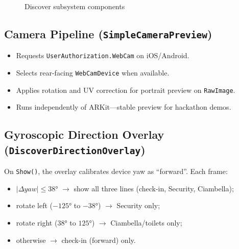\documentclass[11pt,a4paper]{article}
\begin{document}
\begin{figure}[H]
\centering
{}
\caption{Discover subsystem components}
\label{fig:discover}
\end{figure}

\subsection{Camera Pipeline (\texttt{SimpleCameraPreview})}

\begin{itemize}
    \item Requests \texttt{UserAuthorization.WebCam} on iOS/Android.
    \item Selects rear-facing \texttt{WebCamDevice} when available.
    \item Applies rotation and UV correction for portrait preview on \texttt{RawImage}.
    \item Runs independently of ARKit---stable preview for hackathon demos.
\end{itemize}

\subsection{Gyroscopic Direction Overlay (\texttt{DiscoverDirectionOverlay})}

On \texttt{Show()}, the overlay calibrates device yaw as ``forward''. Each frame:

\begin{itemize}
    \item $| \Delta yaw | \leq 38°$ $\rightarrow$ show all three lines (check-in, Security, Ciambella);
    \item rotate left ($-125°$ to $-38°$) $\rightarrow$ Security only;
    \item rotate right ($38°$ to $125°$) $\rightarrow$ Ciambella/toilets only;
    \item otherwise $\rightarrow$ check-in (forward) only.
\end{itemize}
\end{document}
